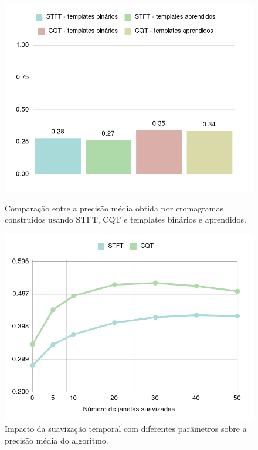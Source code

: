     \begin{figure}[htb]
        \begin{center}
            \includegraphics[width=13cm]{figuras/03-stft-e-cqt-templates-bin-e-aprendidos.png}
            \caption{\label{fig:exp:templates_chroma}Comparação entre a precisão média obtida por cromagramas construídos usando STFT, CQT e templates binários e aprendidos.}
            
            \includegraphics[width=13cm]{figuras/04-stft-e-cqt-bin-suavizacao-temporal.png}
            \caption{\label{fig:exp:temporal}Impacto da suavização temporal com diferentes parâmetros sobre a precisão média do algoritmo.}
        \end{center}
    \end{figure}

